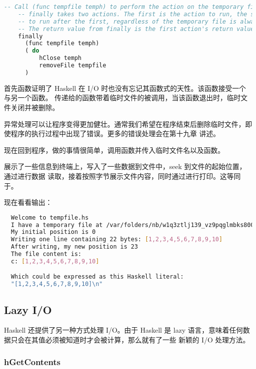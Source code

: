 \documentclass[./main.tex]{subfiles}
\begin{document}
\begin{lstlisting}[language=Haskell]
    -- Call (func tempfile temph) to perform the action on the temporary file.
    -- finally takes two actions. The first is the action to run, the second is an action
    -- to run after the first, regardless of the temporary file is always deleted.
    -- The return value from finally is the first action's return value.
    finally
      (func tempfile temph)
      ( do
          hClose temph
          removeFile tempfile
      )
\end{lstlisting}

首先函数证明了 Haskell 在 I/O 时也没有忘记其函数式的天性。该函数接受一个与另一个函数。
传递给的函数带着临时文件的被调用，当该函数退出时，临时文件关闭并被删除。

异常处理可以让程序变得更加健壮。通常我们希望在程序结束后删除临时文件，即使程序的执行过程中出现了错误。更多的错误处理会在第十九章
讲述。

现在回到程序，做的事情很简单，调用函数并传入临时文件名以及函数。

展示了一些信息到终端上，写入了一些数据到文件中，seek 到文件的起始位置，通过进行数据
读取，接着按照字节展示文件内容，同时通过进行打印。这等同于。

现在看看输出：

\begin{lstlisting}[language=Bash]
  % runhaskell tempfiles.hs
  Welcome to tempfile.hs
  I have a temporary file at /var/folders/nb/w1q3ztlj139_vz9pqglmbks80000gn/T/mytemp3709-0.txt
  My initial position is 0
  Writing one line containing 22 bytes: [1,2,3,4,5,6,7,8,9,10]
  After writing, my new position is 23
  The file content is:
  c: [1,2,3,4,5,6,7,8,9,10]

  Which could be expressed as this Haskell literal:
  "[1,2,3,4,5,6,7,8,9,10]\n"
\end{lstlisting}

\subsection*{Lazy I/O}

Haskell 还提供了另一种方式处理 I/O。由于 Haskell 是 lazy 语言，意味着任何数据只会在其值必须被知道时才会被计算，那么就有了一些
新颖的 I/O 处理方法。

\subsubsection*{hGetContents}
\end{document}
